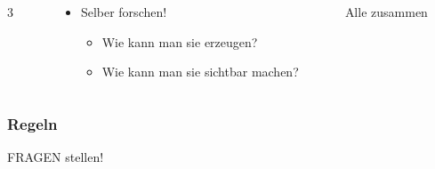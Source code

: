 \documentclass{beamer}
\begin{document}
\begin{frame}
  \begin{columns}
    \begin{column}{0.05\textwidth}
      \centering
      \alert{\Huge 3}
    \end{column}
    \begin{column}{0.68\textwidth}
      \begin{itemize}
      \item Selber forschen!
        \begin{itemize}
        \item Wie kann man sie erzeugen?
        \item Wie kann man sie sichtbar machen?
        \end{itemize}
      \end{itemize}
    \end{column}
    \begin{column}{0.27\textwidth}
      \centering
      \alert{Alle zusammen}
    \end{column}
  \end{columns}
\end{frame}

\begin{frame}
  \frametitle{Regeln}
  \begin{center}
    {\Huge FRAGEN stellen!}
  \end{center}
\end{frame}
\end{document}

